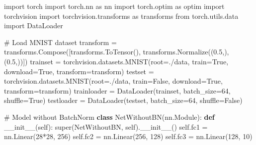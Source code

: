 \documentclass[
  letterpaper,
  DIV=11,
  numbers=noendperiod]{scrreprt}
\newenvironment{Shaded}{\begin{snugshade}}{\end{snugshade}}
\newcommand{\BuiltInTok}[1]{\textcolor[rgb]{0.00,0.23,0.31}{#1}}
\newcommand{\CommentTok}[1]{\textcolor[rgb]{0.37,0.37,0.37}{#1}}
\newcommand{\DecValTok}[1]{\textcolor[rgb]{0.68,0.00,0.00}{#1}}
\newcommand{\FloatTok}[1]{\textcolor[rgb]{0.68,0.00,0.00}{#1}}
\newcommand{\FunctionTok}[1]{\textcolor[rgb]{0.28,0.35,0.67}{#1}}
\newcommand{\ImportTok}[1]{\textcolor[rgb]{0.00,0.46,0.62}{#1}}
\newcommand{\KeywordTok}[1]{\textcolor[rgb]{0.00,0.23,0.31}{\textbf{#1}}}
\newcommand{\NormalTok}[1]{\textcolor[rgb]{0.00,0.23,0.31}{#1}}
\newcommand{\OperatorTok}[1]{\textcolor[rgb]{0.37,0.37,0.37}{#1}}
\newcommand{\StringTok}[1]{\textcolor[rgb]{0.13,0.47,0.30}{#1}}
\newcommand{\VariableTok}[1]{\textcolor[rgb]{0.07,0.07,0.07}{#1}}
\begin{document}
\begin{Shaded}
\begin{Highlighting}[]
\ImportTok{import}\NormalTok{ torch}
\ImportTok{import}\NormalTok{ torch.nn }\ImportTok{as}\NormalTok{ nn}
\ImportTok{import}\NormalTok{ torch.optim }\ImportTok{as}\NormalTok{ optim}
\ImportTok{import}\NormalTok{ torchvision}
\ImportTok{import}\NormalTok{ torchvision.transforms }\ImportTok{as}\NormalTok{ transforms}
\ImportTok{from}\NormalTok{ torch.utils.data }\ImportTok{import}\NormalTok{ DataLoader}

\CommentTok{\# Load MNIST dataset}
\NormalTok{transform }\OperatorTok{=}\NormalTok{ transforms.Compose([transforms.ToTensor(), transforms.Normalize((}\FloatTok{0.5}\NormalTok{,), (}\FloatTok{0.5}\NormalTok{,))])}
\NormalTok{trainset }\OperatorTok{=}\NormalTok{ torchvision.datasets.MNIST(root}\OperatorTok{=}\StringTok{\textquotesingle{}./data\textquotesingle{}}\NormalTok{, train}\OperatorTok{=}\VariableTok{True}\NormalTok{, download}\OperatorTok{=}\VariableTok{True}\NormalTok{, transform}\OperatorTok{=}\NormalTok{transform)}
\NormalTok{testset }\OperatorTok{=}\NormalTok{ torchvision.datasets.MNIST(root}\OperatorTok{=}\StringTok{\textquotesingle{}./data\textquotesingle{}}\NormalTok{, train}\OperatorTok{=}\VariableTok{False}\NormalTok{, download}\OperatorTok{=}\VariableTok{True}\NormalTok{, transform}\OperatorTok{=}\NormalTok{transform)}
\NormalTok{trainloader }\OperatorTok{=}\NormalTok{ DataLoader(trainset, batch\_size}\OperatorTok{=}\DecValTok{64}\NormalTok{, shuffle}\OperatorTok{=}\VariableTok{True}\NormalTok{)}
\NormalTok{testloader }\OperatorTok{=}\NormalTok{ DataLoader(testset, batch\_size}\OperatorTok{=}\DecValTok{64}\NormalTok{, shuffle}\OperatorTok{=}\VariableTok{False}\NormalTok{)}

\CommentTok{\# Model without BatchNorm}
\KeywordTok{class}\NormalTok{ NetWithoutBN(nn.Module):}
    \KeywordTok{def} \FunctionTok{\_\_init\_\_}\NormalTok{(}\VariableTok{self}\NormalTok{):}
        \BuiltInTok{super}\NormalTok{(NetWithoutBN, }\VariableTok{self}\NormalTok{).}\FunctionTok{\_\_init\_\_}\NormalTok{()}
        \VariableTok{self}\NormalTok{.fc1 }\OperatorTok{=}\NormalTok{ nn.Linear(}\DecValTok{28}\OperatorTok{*}\DecValTok{28}\NormalTok{, }\DecValTok{256}\NormalTok{)}
        \VariableTok{self}\NormalTok{.fc2 }\OperatorTok{=}\NormalTok{ nn.Linear(}\DecValTok{256}\NormalTok{, }\DecValTok{128}\NormalTok{)}
        \VariableTok{self}\NormalTok{.fc3 }\OperatorTok{=}\NormalTok{ nn.Linear(}\DecValTok{128}\NormalTok{, }\DecValTok{10}\NormalTok{)}
        

\end{Highlighting}
\end{Shaded}
\end{document}
